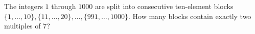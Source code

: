 The integers $1$ through $1000$ are split into consecutive ten-element blocks $\{1,\ldots,10\},\{11,\ldots,20\},\ldots,\{991,\ldots,1000\}$. How many blocks contain exactly two multiples of $7$?
